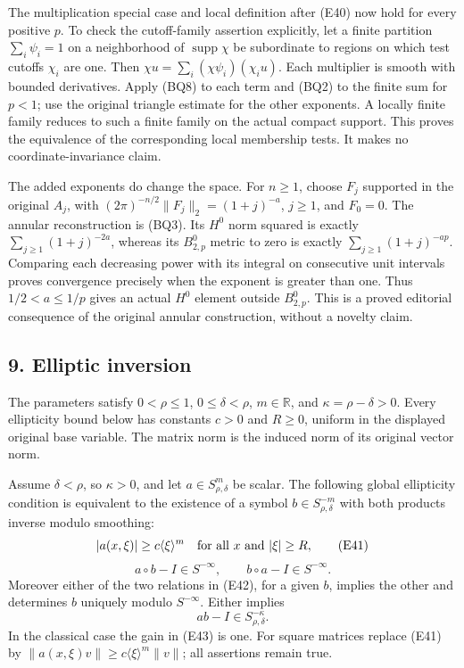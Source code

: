 \documentclass[
  11pt,
]{article}
\begin{document}
The multiplication special case and local definition after (E40) now
hold for every positive \(p\). To check the cutoff-family assertion
explicitly, let a finite partition \(\sum_i\psi_i=1\) on a neighborhood
of \(\operatorname{supp}\chi\) be subordinate to regions on which test
cutoffs \(\chi_i\) are one. Then
\(\chi u=\sum_i(\chi\psi_i)(\chi_i u)\). Each multiplier is smooth with
bounded derivatives. Apply (BQ8) to each term and (BQ2) to the finite
sum for \(p<1\); use the original triangle estimate for the other
exponents. A locally finite family reduces to such a finite family on
the actual compact support. This proves the equivalence of the
corresponding local membership tests. It makes no coordinate-invariance
claim.

The added exponents do change the space. For \(n\ge1\), choose \(F_j\)
supported in the original \(A_j\), with
\((2\pi)^{-n/2}\|F_j\|_2=(1+j)^{-a}\), \(j\ge1\), and \(F_0=0\). The
annular reconstruction is (BQ3). Its \(H^0\) norm squared is exactly
\(\sum_{j\ge1}(1+j)^{-2a}\), whereas its \(B^0_{2,p}\) metric to zero is
exactly \(\sum_{j\ge1}(1+j)^{-ap}\). Comparing each decreasing power
with its integral on consecutive unit intervals proves convergence
precisely when the exponent is greater than one. Thus \(1/2<a\le1/p\)
gives an actual \(H^0\) element outside \(B^0_{2,p}\). This is a proved
editorial consequence of the original annular construction, without a
novelty claim.

\subsection{9. Elliptic inversion}\label{elliptic-inversion}

The parameters satisfy \(0<\rho\leq1\), \(0\leq\delta<\rho\),
\(m\in\mathbb R\), and \(\kappa=\rho-\delta>0\). Every ellipticity bound
below has constants \(c>0\) and \(R\geq0\), uniform in the displayed
original base variable. The matrix norm is the induced norm of its
original vector norm.

Assume \(\delta<\rho\), so \(\kappa>0\), and let
\(a\in S^m_{\rho,\delta}\) be scalar. The following global ellipticity
condition is equivalent to the existence of a symbol
\(b\in S^{-m}_{\rho,\delta}\) with both products inverse modulo
smoothing: \[
|a(x,\xi)|\geq c\langle\xi\rangle^m
\quad\hbox{for all }x\hbox{ and }|\xi|\geq R,
\tag{E41}
\] \[
a\circ b-I\in S^{-\infty},\qquad
b\circ a-I\in S^{-\infty}.
\tag{E42}
\] Moreover either of the two relations in (E42), for a given \(b\),
implies the other and determines \(b\) uniquely modulo \(S^{-\infty}\).
Either implies \[
ab-I\in S^{-\kappa}_{\rho,\delta}.
\tag{E43}
\] In the classical case the gain in (E43) is one. For square matrices
replace (E41) by \(\|a(x,\xi)v\|\geq c\langle\xi\rangle^m\|v\|\); all
assertions remain true.
\end{document}

